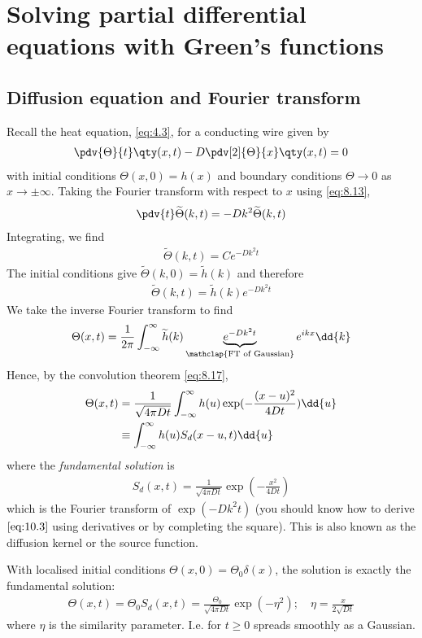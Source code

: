 \section{Solving partial differential equations with Green's functions}

\subsection{Diffusion equation and Fourier transform}
Recall the heat equation, \cref{eq:4.3}, for a conducting wire given by
\begin{align} \label{eq:10.1}
	\pdv{\Theta}{t}\qty(x,t) - D\pdv[2]{\Theta}{x}\qty(x,t) = 0
\end{align}
with initial conditions $\Theta(x,0) = h(x)$ and boundary conditions $\Theta \to 0$ as $x \to \pm \infty$.
Taking the Fourier transform with respect to $x$ using \cref{eq:8.13},
\begin{align*}
	\pdv{t} \widetilde \Theta(k,t) = -D k^2 \widetilde \Theta(k,t)
\end{align*}
Integrating, we find
\begin{align*}
	\widetilde \Theta(k,t) = C e^{-D k^2 t}
\end{align*}
The initial conditions give $\widetilde \Theta(k,0) = \widetilde h(k)$ and therefore
\begin{align*}
	\widetilde \Theta(k,t) = \widetilde h(k) e^{-Dk^2 t}
\end{align*}
We take the inverse Fourier transform to find
\begin{align*}
	\Theta(x,t) = \frac{1}{2\pi} \int_{-\infty}^\infty \widetilde h(k) \underbrace{e^{-Dk^2 t}}_{\mathclap{\text{FT of Gaussian}}} e^{ikx} \dd{k}
\end{align*}
Hence, by the convolution theorem \cref{eq:8.17},
\begin{align} \label{eq:10.2}
	\Theta(x,t) &= \frac{1}{\sqrt{4 \pi D t}} \int_{-\infty}^\infty h(u) \exp(-\frac{(x-u)^2}{4Dt}) \dd{u} \notag \\
	&\equiv \int_{-\infty}^\infty h(u) S_d(x-u,t) \dd{u}
\end{align}
where the \textit{fundamental solution} is
\begin{align} \label{eq:10.3}
	S_d(x,t) = \frac{1}{\sqrt{4 \pi D t}} \exp(-\frac{x^2}{4Dt})
\end{align}
which is the Fourier transform of $\exp(-D k^2 t)$ (you should know how to derive $\cref{eq:10.3}$ using derivatives or by completing the square).
This is also known as the diffusion kernel or the source function.
\begin{note}
	With localised initial conditions $\Theta(x,0) = \Theta_0 \delta(x)$, the solution is exactly the fundamental solution:
	\begin{align} \label{eq:10.4}
		\Theta(x,t) = \Theta_0 S_d(x,t) = \frac{\Theta_0}{\sqrt{4 \pi D t}} \exp(-\eta^2);\quad \eta = \frac{x}{2\sqrt{Dt}}
	\end{align}
	where $\eta$ is the similarity parameter.
	I.e. for $t \geq 0$ spreads smoothly as a Gaussian.
\end{note} 

